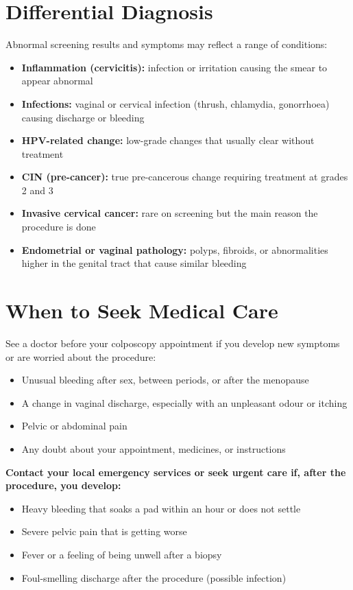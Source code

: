 \section*{Differential Diagnosis}
Abnormal screening results and symptoms may reflect a range of conditions:

\begin{itemize}
    \item \textbf{Inflammation (cervicitis):} infection or irritation causing the smear to appear abnormal
    \item \textbf{Infections:} vaginal or cervical infection (thrush, chlamydia, gonorrhoea) causing discharge or bleeding
    \item \textbf{HPV-related change:} low-grade changes that usually clear without treatment
    \item \textbf{CIN (pre-cancer):} true pre-cancerous change requiring treatment at grades 2 and 3
    \item \textbf{Invasive cervical cancer:} rare on screening but the main reason the procedure is done
    \item \textbf{Endometrial or vaginal pathology:} polyps, fibroids, or abnormalities higher in the genital tract that cause similar bleeding
\end{itemize}

\section*{When to Seek Medical Care}
See a doctor before your colposcopy appointment if you develop new symptoms or are worried about the procedure:

\begin{itemize}
    \item Unusual bleeding after sex, between periods, or after the menopause
    \item A change in vaginal discharge, especially with an unpleasant odour or itching
    \item Pelvic or abdominal pain
    \item Any doubt about your appointment, medicines, or instructions
\end{itemize}

\textbf{Contact your local emergency services or seek urgent care if, after the procedure, you develop:}
\begin{itemize}
    \item Heavy bleeding that soaks a pad within an hour or does not settle
    \item Severe pelvic pain that is getting worse
    \item Fever or a feeling of being unwell after a biopsy
    \item Foul-smelling discharge after the procedure (possible infection)
\end{itemize}

